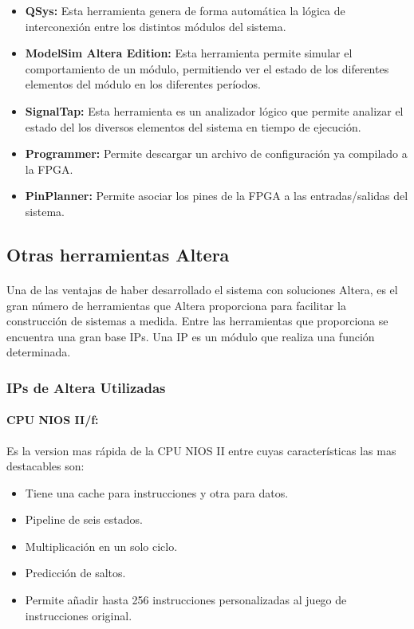 \documentclass[a4paper,12pt,titlepage,final]{book}
\begin{document}
\begin{itemize}
\item \textbf{QSys:} Esta herramienta genera de forma automática la lógica de interconexión
entre los distintos módulos del sistema.

\item \textbf{ModelSim Altera Edition:} Esta herramienta permite simular el comportamiento de
un módulo, permitiendo ver el estado de los diferentes elementos del módulo en
los diferentes períodos.

\item \textbf{SignalTap:} Esta herramienta es un analizador lógico que permite analizar el
estado del los diversos elementos del sistema en tiempo de ejecución.

\item \textbf{Programmer:} Permite descargar un archivo de configuración ya compilado a la FPGA.

\item \textbf{PinPlanner:} Permite asociar los pines de la FPGA a las entradas/salidas del sistema.
\end{itemize}

\subsection{Otras herramientas Altera }

\paragraph{}
Una de las ventajas de haber desarrollado el sistema con soluciones Altera, es el gran número de herramientas que Altera proporciona para facilitar la construcción de sistemas a medida. Entre las herramientas que proporciona se encuentra una gran base IPs. Una IP es un módulo que realiza una función determinada.

\subsubsection{IPs de Altera Utilizadas}

\paragraph{CPU NIOS II/f:}
Es la version mas rápida de la CPU NIOS II entre cuyas características las mas destacables son:

\begin{itemize}
\item Tiene una cache para instrucciones y otra para datos.

\item Pipeline de seis estados.

\item Multiplicación en un solo ciclo.

\item Predicción de saltos.

\item Permite añadir hasta 256 instrucciones personalizadas al juego de instrucciones
original.

\end{itemize}
\end{document}
